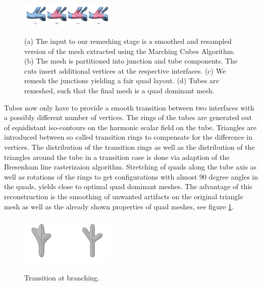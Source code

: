 \begin{figure}[h]
	\centering
	\includegraphics[width=0.4\textwidth]{./Images/Remeshing_stage.png} \\
	\caption{ (a) The input to our remeshing stage is a smoothed and resampled version of the mesh extracted using the Marching Cubes Algorithm. (b) The mesh is partitioned into junction and tube components. The cuts insert additional vertices at the respective interfaces. (c) We remesh the junctions yielding a fair quad layout. (d) Tubes are remeshed, such that the final mesh is a quad dominant mesh.}
	\cite{sibbing2012topology}
	\label{fig:Remeshing_stage}
\end{figure}

Tubes now only have to provide a smooth transition between two interfaces with a possibly different number of vertices. The rings of the tubes are generated out of equidistant iso-contours on the harmonic scalar field on the tube. Triangles are introduced between so called transition rings to compensate for the difference in vertices. The distribution of the transition rings as well as the distribution of the triangles around the tube in a transition case is done via adaption of the Bresenham line rasterizaion algorithm. Stretching of quads along the tube axis as well as rotations of the rings to get configurations with almost $90$ degree angles in the quads, yields close to optimal quad dominant meshes. The advantage of this reconstruction is the smoothing of unwanted artifacts on the original triangle mesh as well as the already shown properties of quad meshes, see figure \ref{fig:Remeshing_stage}.


\begin{figure}[h]
	\centering
	\includegraphics[width=0.4\textwidth]{./Images/Branching_ConvolutionSurfaces.png} \\
	\caption{Transition at branching.}
	\cite{oeltze2005visualization}
	\label{fig:Branching_ConvolutionSurfaces}
\end{figure}

